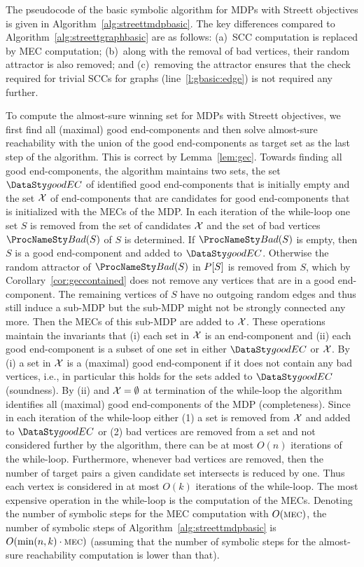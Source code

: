 The pseudocode of the basic symbolic algorithm for MDPs with Streett objectives
is given in Algorithm~\ref{alg:streettmdpbasic}. The key differences
compared to Algorithm~\ref{alg:streettgraphbasic} are as follows: 
(a)~SCC computation is replaced by MEC computation;
(b)~along with the removal of bad vertices, their random attractor is also removed;
and (c)~removing the attractor ensures that the check required for trivial SCCs
for graphs (line~\ref{l:gbasic:edge})
is not required any further.

To compute the almost-sure winning set for MDPs with Streett objectives,
we first find all (maximal) good end-components and then solve almost-sure
reachability with the union of the good end-components as target set as the last 
step of the algorithm. This is correct by Lemma~\ref{lem:gec}. Towards finding 
all good end-components, the algorithm maintains two sets, the set $\good$ of
identified good end-components that is initially empty and the set $\mathcal{X}$ 
of end-components that are candidates for good end-components that is 
initialized with the MECs of the MDP.
In each iteration of the while-loop one set $S$ is removed from the set of 
candidates $\mathcal{X}$ and the set of bad vertices $\bad(S)$ of $S$
is determined. If $\bad(S)$ is empty, then $S$ is a good end-component and 
added to $\good$. Otherwise the random attractor of $\bad(S)$ in $P[S]$
is removed from $S$, which by Corollary~\ref{cor:geccontained} does not 
remove any vertices that are in a good end-component. The remaining vertices of 
$S$ have no outgoing random edges and thus still induce a sub-MDP but the 
sub-MDP might not be strongly connected any more. Then the MECs
of this sub-MDP are added to $\mathcal{X}$.
These operations maintain the invariants that (i) each set in $\mathcal{X}$
is an end-component and (ii) each good end-component is a subset of one set 
in either $\good$ or $\mathcal{X}$. By (i) a set in $\mathcal{X}$ is a (maximal) 
good end-component if it does not contain any bad vertices, i.e., in particular
this holds for the sets added to $\good$ (soundness). By (ii) and 
$\mathcal{X} = \emptyset$ at termination of the while-loop the algorithm
identifies all (maximal) good end-components of the MDP (completeness).
Since in each iteration of the while-loop either (1) a set is removed from $\mathcal{X}$
and added to $\good$ or (2) bad vertices are removed from a set and not considered 
further by the algorithm, there can be at most $O(n)$ iterations of the while-loop. 
Furthermore, whenever bad vertices are removed, then the number of target pairs
a given candidate set intersects is reduced by one. Thus each vertex %
is considered in at most $O(k)$ iterations of the while-loop.
The most expensive operation in the while-loop is the computation of the MECs. 
Denoting the number of symbolic steps for the MEC computation with $O(\textsc{mec})$,
the number of symbolic steps of Algorithm~\ref{alg:streettmdpbasic} 
is $O(\min(n, k) \cdot \textsc{mec})$ (assuming that the number of symbolic steps 
for the almost-sure reachability computation is lower than that).


